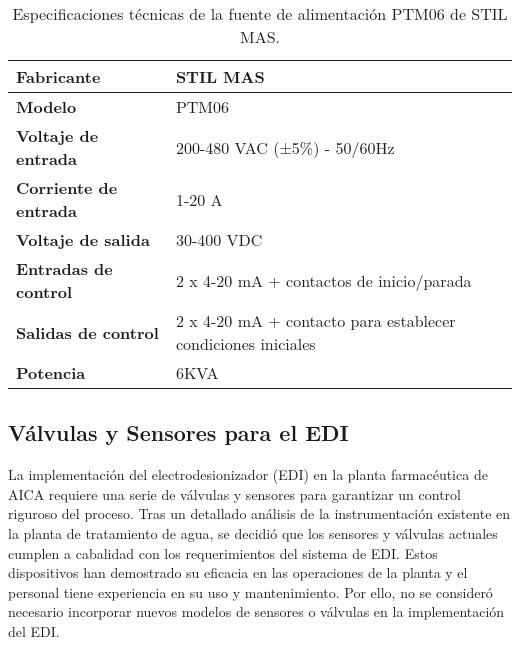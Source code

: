 \begin{table}[H]
    \centering
    \caption{Especificaciones técnicas de la fuente de alimentación PTM06 de STIL MAS.}
    \label{table:power_supply_specs}
    \begin{tabular}{| L{6cm} | L{6cm} |}
        \hline
        \textbf{Fabricante}           & STIL MAS                                                     \\
        \hline
        \textbf{Modelo}               & PTM06                                                        \\
        \hline
        \textbf{Voltaje de entrada}   & 200-480 VAC (±5\%) - 50/60Hz                                 \\
        \hline
        \textbf{Corriente de entrada} & 1-20 A                                                       \\
        \hline
        \textbf{Voltaje de salida}    & 30-400 VDC                                                   \\
        \hline
        \textbf{Entradas de control}  & 2 x 4-20 mA + contactos de inicio/parada                     \\
        \hline
        \textbf{Salidas de control}   & 2 x 4-20 mA + contacto para establecer condiciones iniciales \\
        \hline
        \textbf{Potencia}             & 6KVA                                                         \\
        \hline
    \end{tabular}
\end{table}



\subsection{Válvulas y Sensores para el EDI}

La implementación del electrodesionizador (EDI) en la planta farmacéutica de AICA requiere una serie de válvulas y sensores para garantizar un control riguroso del proceso. Tras un detallado análisis de la instrumentación existente en la planta de tratamiento de agua, se decidió que los sensores y válvulas actuales cumplen a cabalidad con los requerimientos del sistema de EDI. Estos dispositivos han demostrado su eficacia en las operaciones de la planta y el personal tiene experiencia en su uso y mantenimiento. Por ello, no se consideró necesario incorporar nuevos modelos de sensores o válvulas en la implementación del EDI.

